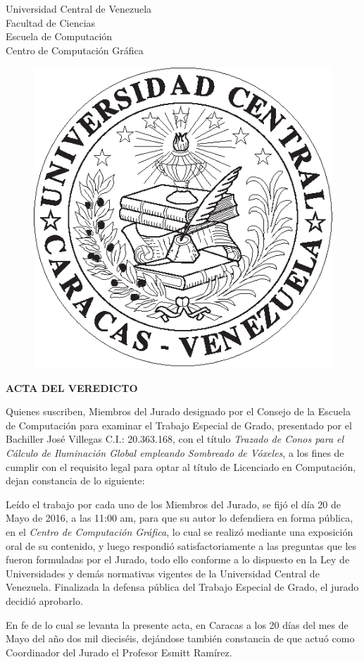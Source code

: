 \begingroup
\newpage
\label{ch:acta}
\pagestyle{empty}
\thispagestyle{empty}
\onehalfspacing
\setlength{\parindent}{4em}
					\begin{center}
						Universidad Central de Venezuela\\
						Facultad de Ciencias\\
						Escuela de Computación\\
						Centro de Computación Gráfica\\
					\end{center}
						\begin{figure}[htpb]
						\centering
							\includegraphics[height=0.15\textwidth]{media/logoucv.eps}
	                    \end{figure}
					\begin{center}
						\large{\textbf{ACTA DEL VEREDICTO}}
						\vspace{1.0cm}
					\end{center}
					
Quienes suscriben, Miembros del Jurado designado por el Consejo de la Escuela de Computación para examinar el Trabajo Especial de Grado, presentado por el Bachiller José Villegas C.I.: 20.363.168, con el título \emph{Trazado de Conos para el Cálculo de Iluminación Global empleando Sombreado de Vóxeles}, a los fines de cumplir con el requisito legal para optar al título de Licenciado en Computación, dejan constancia de lo siguiente:

Leído el trabajo por cada uno de los Miembros del Jurado, se fijó el día 20 de Mayo de 2016, a las 11:00 am, para que su autor lo defendiera en forma pública, en el \emph{Centro de Computación Gráfica}, lo cual se realizó mediante una exposición oral de su contenido, y luego respondió satisfactoriamente a las preguntas que les fueron formuladas por el Jurado, todo ello conforme a lo dispuesto en la Ley de Universidades y demás normativas vigentes de la Universidad Central de Venezuela. Finalizada la defensa pública del Trabajo Especial de Grado, el jurado decidió aprobarlo.

En fe de lo cual se levanta la presente acta, en Caracas a los 20 días del mes de Mayo del año dos mil dieciséis, dejándose también constancia de que actuó como Coordinador del Jurado el Profesor Esmitt Ramírez.					
					\vspace{1.2cm}
				
